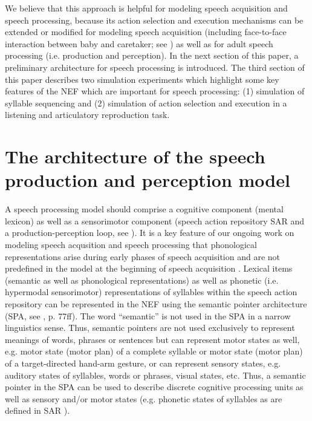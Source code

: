 \documentclass[conference]{IEEEtran}
\begin{document}
We believe that this approach is helpful for modeling speech
acquisition and speech processing, because its action selection and
execution mechanisms can be extended or modified for modeling speech
acquisition (including face-to-face interaction between baby and
caretaker; see \cite{kroger2011}) as well as for adult speech
processing (i.e. production and perception). In the next section of
this paper, a preliminary architecture for speech processing is
introduced. The third section of this paper describes two simulation
experiments which highlight some key features of the NEF which are
important for speech processing: (1) simulation of syllable sequencing
and (2) simulation of action selection and execution in a listening
and articulatory reproduction task.

\section{The architecture of the speech production and perception
  model}

A speech processing model should comprise a cognitive component
(mental lexicon) as well as a sensorimotor component (speech action
repository SAR and a production-perception loop, see
\cite{kroger2009,kroger2014,kroger2012,kroger2011a,eckers2013,eckers2013a,kroger2010}).
It is a key feature of our ongoing work on modeling speech acqusition
and speech processing that phonological representations arise during
early phases of speech acquisition and are not predefined in the model
at the beginning of speech acquisition
\cite{kroger2009,kroger2014,kroger2011}. Lexical items (semantic as
well as phonological representations) as well as phonetic (i.e.
hypermodal sensorimotor) representations of syllables within the
speech action repository
\cite{kroger2012,kroger2011a,eckers2013,eckers2013a,kroger2010} can be
represented in the NEF using the semantic pointer architecture (SPA, see
\cite{eliasmith2013}, p. 77ff). The word ``semantic'' is not used in
the SPA in a narrow linguistics sense. Thus, semantic pointers are not
used exclusively to represent meanings of words, phrases or sentences
but can represent motor states as well, e.g. motor state (motor plan)
of a complete syllable or motor state (motor plan) of a
target-directed hand-arm gesture, or can represent sensory states,
e.g. auditory states of syllables, words or phrases, visual states,
etc. Thus, a semantic pointer in the SPA can be used to describe
discrete cognitive processing units as well as sensory and/or motor
states (e.g. phonetic states of syllables as are defined in SAR
\cite{kroger2012,kroger2011a,eckers2013,eckers2013a,kroger2010}).
\end{document}
